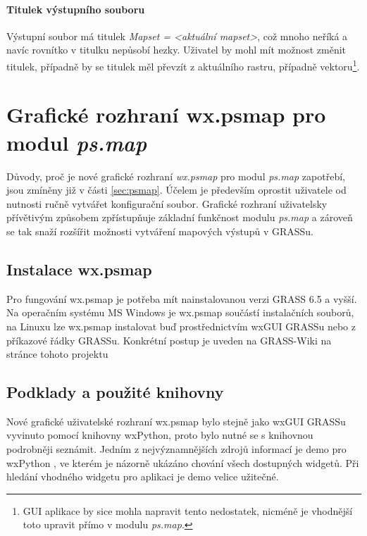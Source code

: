 \documentclass[a4paper,12pt,draft]{article}
\newcommand{\modul}[1]{\emph{#1}}
\begin{document}
\paragraph*{Titulek výstupního souboru}
Výstupní soubor má titulek \emph{Mapset = \textless aktuální
mapset\textgreater}, což mnoho neříká a navíc rovnítko v titulku
nepůsobí hezky. Uživatel by mohl mít možnost změnit titulek,
případně by se titulek měl převzít z aktuálního rastru, případně
vektoru\footnote{GUI aplikace by sice mohla napravit tento nedostatek,
nicméně je vhodnější toto upravit přímo v modulu \modul{ps.map}.}.



\section{Grafické rozhraní  wx.psmap pro modul \modul{ps.map}}
\label{sec:gui}

Důvody, proč je nové grafické rozhraní \emph{wx.psmap} pro
modul \modul{ps.map} zapotřebí, jsou zmíněny již v části
\ref{sec:psmap}. Účelem je především oprostit uživatele od nutnosti
ručně vytvářet konfigurační soubor. Grafické rozhraní uživatelsky
přívětivým způsobem zpřístupňuje základní funkčnost modulu
\modul{ps.map} a zároveň se tak snaží rozšířit možnosti vytváření
mapových výstupů v GRASSu.

\subsection{Instalace wx.psmap}
Pro fungování wx.psmap je potřeba mít nainstalovanou verzi
GRASS 6.5 a vyšší. Na operačním systému MS Windows je wx.psmap
součástí instalačních souborů, na Linuxu lze wx.psmap instalovat buď
prostřednictvím wxGUI GRASSu nebo z příkazové řádky GRASSu. Konkrétní
postup je uveden na GRASS-Wiki na stránce tohoto projektu \cite{wiki_wxpsmap}
\subsection{Podklady a použité knihovny}
Nové grafické uživatelské rozhraní wx.psmap bylo stejně jako wxGUI
GRASSu vyvinuto pomocí knihovny wxPython,
proto bylo nutné se s knihovnou podrobněji seznámit. Jedním z
nejvýznamnějších zdrojů informací je demo pro wxPython \cite{demo},
ve kterém je názorně ukázáno chování všech dostupných widgetů. Při
hledání vhodného widgetu pro aplikaci je demo velice užitečné.
\end{document}

